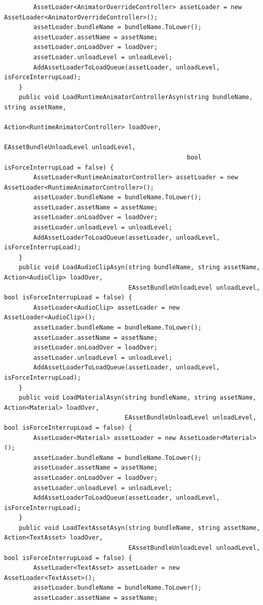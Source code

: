 \documentclass[9pt, b5paper]{article}
\begin{document}
\begin{verbatim}
        AssetLoader<AnimatorOverrideController> assetLoader = new AssetLoader<AnimatorOverrideController>();
        assetLoader.bundleName = bundleName.ToLower();
        assetLoader.assetName = assetName;
        assetLoader.onLoadOver = loadOver;
        assetLoader.unloadLevel = unloadLevel;
        AddAssetLoaderToLoadQueue(assetLoader, unloadLevel, isForceInterrupLoad);
    }
    public void LoadRuntimeAnimatorControllerAsyn(string bundleName, string assetName,
                                                  Action<RuntimeAnimatorController> loadOver, 
                                                  EAssetBundleUnloadLevel unloadLevel,
                                                  bool isForceInterrupLoad = false) {
        AssetLoader<RuntimeAnimatorController> assetLoader = new AssetLoader<RuntimeAnimatorController>();
        assetLoader.bundleName = bundleName.ToLower();
        assetLoader.assetName = assetName;
        assetLoader.onLoadOver = loadOver;
        assetLoader.unloadLevel = unloadLevel;
        AddAssetLoaderToLoadQueue(assetLoader, unloadLevel, isForceInterrupLoad);
    }
    public void LoadAudioClipAsyn(string bundleName, string assetName, Action<AudioClip> loadOver, 
                                  EAssetBundleUnloadLevel unloadLevel, bool isForceInterrupLoad = false) {
        AssetLoader<AudioClip> assetLoader = new AssetLoader<AudioClip>();
        assetLoader.bundleName = bundleName.ToLower();
        assetLoader.assetName = assetName;
        assetLoader.onLoadOver = loadOver;
        assetLoader.unloadLevel = unloadLevel;
        AddAssetLoaderToLoadQueue(assetLoader, unloadLevel, isForceInterrupLoad);
    }
    public void LoadMaterialAsyn(string bundleName, string assetName, Action<Material> loadOver, 
                                 EAssetBundleUnloadLevel unloadLevel, bool isForceInterrupLoad = false) {
        AssetLoader<Material> assetLoader = new AssetLoader<Material>();
        assetLoader.bundleName = bundleName.ToLower();
        assetLoader.assetName = assetName;
        assetLoader.onLoadOver = loadOver;
        assetLoader.unloadLevel = unloadLevel;
        AddAssetLoaderToLoadQueue(assetLoader, unloadLevel, isForceInterrupLoad);
    }
    public void LoadTextAssetAsyn(string bundleName, string assetName, Action<TextAsset> loadOver, 
                                  EAssetBundleUnloadLevel unloadLevel, bool isForceInterrupLoad = false) {
        AssetLoader<TextAsset> assetLoader = new AssetLoader<TextAsset>();
        assetLoader.bundleName = bundleName.ToLower();
        assetLoader.assetName = assetName;

\end{verbatim}
\end{document}
